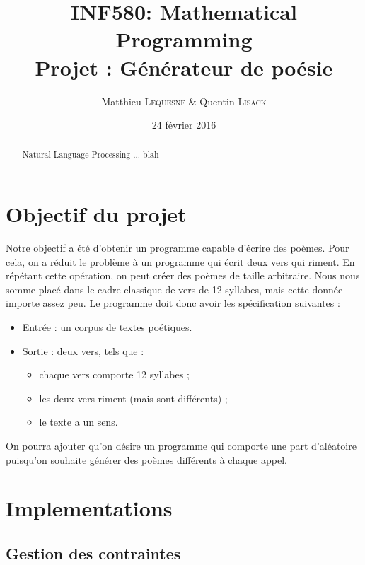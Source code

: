 \documentclass[a4paper,11pt]{article}
\title{INF580: Mathematical Programming \\ Projet : Générateur de poésie}
\author{Matthieu \textsc{Lequesne} \& Quentin \textsc{Lisack}}
\date{24 février 2016}
\begin{document}
\maketitle
\setcounter{tocdepth}{2}
\tableofcontents

\vspace{1cm}

\begin{abstract}
Natural Language Processing ... blah
\end{abstract}

\vfill

\newpage

\section{Objectif du projet}

Notre objectif a été d'obtenir un programme capable d'écrire des poèmes. Pour cela, on a réduit le problème à un programme qui écrit deux vers qui riment. En répétant cette opération, on peut créer des poèmes de taille arbitraire. Nous nous somme placé dans le cadre classique de vers de 12 syllabes, mais cette donnée importe assez peu. Le programme doit donc avoir les spécification suivantes :

\begin{itemize}
\item Entrée : un corpus de textes poétiques.
\item Sortie : deux vers, tels que :
\begin{itemize}
\item chaque vers comporte 12 syllabes ;
\item les deux vers riment (mais sont différents) ;
\item le texte a un sens.
\end{itemize}
\end{itemize}

On pourra ajouter qu'on désire un programme qui comporte une part d'aléatoire puisqu'on souhaite générer des poèmes différents à chaque appel.

\section{Implementations}

\subsection{Gestion des contraintes}
\end{document}
